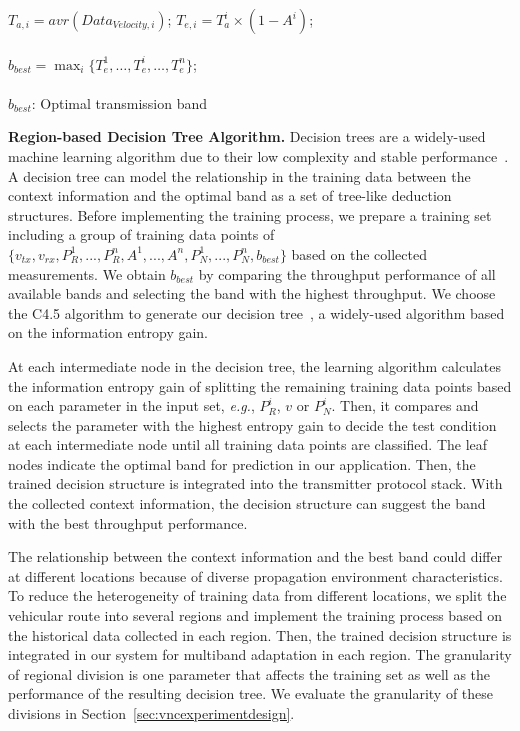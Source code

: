 \begin{algorithm}
\begin{algorithmic}[1]
\STATE $T_{a,i}=avr(Data_{Velocity,i})$;
\STATE  $T_{e,i}=T_a^i\times(1-A^i)$;
\ENDFOR \\  
\ENDFOR \\  
\STATE $b_{best} = \max_i\{T_e^1,\dots,T_e^i,\dots,T_e^n\}$;\\
\ENSURE ~~\\    
$b_{best}$: Optimal transmission band
\end{algorithmic}
\end{algorithm}

{\bf Region-based Decision Tree Algorithm.} Decision trees are a  
widely-used machine learning 
algorithm due to their low complexity and stable performance~\cite{banfield2007}.
A decision tree can model the relationship in the training data between the context 
information and the optimal band as a set of tree-like deduction structures. Before 
implementing the training process, we prepare a training set including a group of 
training data points of $\{v_{tx}, v_{rx}, P_R^1, ..., P_R^n,  A^1, ..., A^n, P_N^1, 
..., P_N^n, b_{best}\}$ based on the collected measurements. We obtain $b_{best}$ by comparing
the throughput performance of all available bands and selecting the band with the highest 
throughput. We choose the C4.5 algorithm to generate our decision tree~\cite{hall2009weka}, a widely-used algorithm based on the 
information entropy gain. 

At each intermediate
node in the decision tree, the learning algorithm calculates the information entropy 
gain of splitting the remaining training data points based on each parameter in the input 
set, {\it e.g.}, $P_R^i$, $v$ or $P_N^i$. Then, it compares and selects the parameter with 
the highest entropy gain to decide the test condition at each intermediate node until 
all training data points are classified.  The leaf nodes indicate the optimal band for 
prediction in our application. Then, the trained decision structure is integrated into 
the transmitter protocol stack. With the collected context information, the decision 
structure can suggest the band with the best throughput performance. 

The relationship between the context information and the best band could differ at
different locations because of diverse propagation environment characteristics. 
To reduce the heterogeneity of training data from different locations, we split 
the vehicular route into several regions and implement the training process based 
on the historical data collected in each region. Then, the trained decision structure 
is integrated in our system for multiband adaptation in each region. The granularity 
of regional division is one parameter that affects the training set as well as the 
performance of the resulting decision tree. We 
evaluate the granularity of these divisions in Section~\ref{sec:vncexperimentdesign}.
